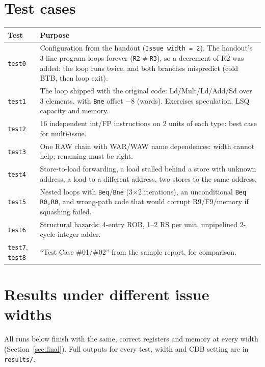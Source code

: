 \documentclass[11pt]{article}
\begin{document}
\section{Test cases}
\begin{table}[H]\centering\small
\begin{tabular}{@{}l p{}@{}}\toprule
Test & Purpose \\\midrule
\texttt{test0} & Configuration from the handout (\texttt{Issue width = 2}). The handout's 3-line program loops forever (\texttt{R2}$\neq$\texttt{R3}), so a decrement of R2 was added: the loop runs twice, and both branches mispredict (cold BTB, then loop exit). \\
\texttt{test1} & The loop shipped with the original code: Ld/Mult/Ld/Add/Sd over 3 elements, with \texttt{Bne} offset $-8$ (words). Exercises speculation, LSQ capacity and memory. \\
\texttt{test2} & 16 independent int/FP instructions on 2 units of each type: best case for multi-issue. \\
\texttt{test3} & One RAW chain with WAR/WAW name dependences: width cannot help; renaming must be right. \\
\texttt{test4} & Store-to-load forwarding, a load stalled behind a store with unknown address, a load to a different address, two stores to the same address. \\
\texttt{test5} & Nested loops with \texttt{Beq}/\texttt{Bne} (3$\times$2 iterations), an unconditional \texttt{Beq R0,R0}, and wrong-path code that would corrupt R9/F9/memory if squashing failed. \\
\texttt{test6} & Structural hazards: 4-entry ROB, 1--2 RS per unit, unpipelined 2-cycle integer adder. \\
\texttt{test7}, \texttt{test8} & ``Test Case \#01/\#02'' from the sample report, for comparison. \\
\bottomrule\end{tabular}
\end{table}

\section{Results under different issue widths}\label{sec:results}
All runs below finish with the same, correct registers and memory at every width (Section~\ref{sec:final}).
Full outputs for every test, width and CDB setting are in \texttt{results/}.

\begin{table}[H]\centering\small

\caption{Total cycles. \emph{Best speedup} = cycles at $W{=}1$ / fewest cycles at any width and CDB setting.}
\end{table}
\begin{table}[H]\centering\small

\caption{IPC (committed instructions / cycles), and branch mispredictions / squashed instructions at $W{=}1$.}
\end{table}
\end{document}
